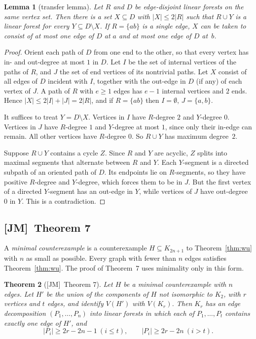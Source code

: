 \documentclass[11pt]{amsart}
\newtheorem{theorem}{Theorem}[section]
\newtheorem{lemma}[theorem]{Lemma}
\theoremstyle{definition}
\theoremstyle{remark}
\newcommand{\JM}{\textup{[JM]}}
\begin{document}
\begin{lemma}[transfer lemma]\label{lem:transfer}
Let $R$ and $D$ be edge-disjoint linear forests on the same vertex set. Then there is a set
$X\subseteq D$ with $|X|\le 2|R|$ such that $R\cup Y$ is a linear forest for every
$Y\subseteq D\setminus X$. If $R=\{ab\}$ is a single edge, $X$ can be taken to consist of at
most one edge of $D$ at $a$ and at most one edge of $D$ at~$b$.
\end{lemma}

\begin{proof}
Orient each path of $D$ from one end to the other, so that every vertex has in- and
out-degree at most $1$ in $D$. Let $I$ be the set of internal vertices of the paths of $R$,
and $J$ the set of end vertices of its nontrivial paths. Let $X$ consist of all edges of $D$
incident with $I$, together with the out-edge in $D$ (if any) of each vertex of $J$. A path of
$R$ with $e\ge1$ edges has $e-1$ internal vertices and $2$ ends. Hence
$|X|\le 2|I|+|J|=2|R|$, and if $R=\{ab\}$ then $I=\emptyset$, $J=\{a,b\}$.

It suffices to treat $Y=D\setminus X$. Vertices in $I$ have $R$-degree $2$ and $Y$-degree
$0$. Vertices in $J$ have $R$-degree $1$ and $Y$-degree at most $1$, since only their in-edge
can remain. All other vertices have $R$-degree $0$. So $R\cup Y$ has maximum degree~$2$.

Suppose $R\cup Y$ contains a cycle $Z$. Since $R$ and $Y$ are acyclic, $Z$ splits into
maximal segments that alternate between $R$ and $Y$. Each $Y$-segment is a directed subpath of
an oriented path of $D$. Its endpoints lie on $R$-segments, so they have positive $R$-degree
and $Y$-degree, which forces them to be in $J$. But the first vertex of a directed $Y$-segment
has an out-edge in $Y$, while vertices of $J$ have out-degree $0$ in $Y$. This is a
contradiction.
\end{proof}

\subsection{\JM\ Theorem 7}
A \emph{minimal counterexample} is a counterexample $H\subseteq K_{2n+1}$ to
Theorem~\ref{thm:wu} with $n$ as small as possible. Every graph with fewer than $n$ edges
satisfies Theorem~\ref{thm:wu}. The proof of Theorem~7 uses minimality only in this form.

\begin{theorem}[\JM\ Theorem 7]\label{thm:jm7}
Let $H$ be a minimal counterexample with $n$ edges. Let $H'$ be the union of the components of
$H$ not isomorphic to $K_2$, with $r$ vertices and $t$ edges, and identify $V(H')$ with $V(K_r)$.
Then $K_r$ has an edge decomposition $(P_1,\dots,P_n)$ into linear forests in which each of
$P_1,\dots,P_t$ contains exactly one edge of $H'$, and
\[
|P_i|\ge 2r-2n-1\ (i\le t),\qquad |P_i|\ge 2r-2n\ (i>t).
\]
\end{theorem}
\end{document}
